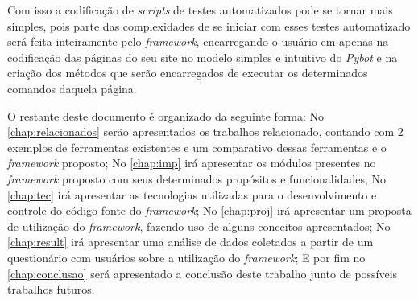     Com isso a codificação de \textit{scripts} de testes automatizados pode se tornar mais simples, pois parte das complexidades de se iniciar com esses testes automatizado será
    feita inteiramente pelo \textit{framework}, encarregando o usuário em apenas na  codificação das páginas do seu site no modelo simples e intuitivo do \textit{Pybot} e na criação dos métodos que
    serão encarregados de executar os determinados comandos daquela página.

    O restante deste documento é organizado da seguinte forma:
    No \autoref{chap:relacionados} serão apresentados os trabalhos relacionado, contando com 2 exemplos de ferramentas existentes e um comparativo dessas ferramentas e o \textit{framework} proposto;
    No \autoref{chap:imp} irá apresentar os módulos presentes no \textit{framework} proposto com seus determinados propósitos e funcionalidades;
    No \autoref{chap:tec} irá apresentar as tecnologias utilizadas para o desenvolvimento e controle do código fonte do \textit{framework};
    No \autoref{chap:proj} irá apresentar um proposta de utilização do \textit{framework}, fazendo uso de alguns conceitos apresentados;
    No \autoref{chap:result} irá apresentar uma análise de dados coletados a partir de um questionário com usuários sobre a utilização do \textit{framework};
    E por fim no \autoref{chap:conclusao} será apresentado a conclusão deste trabalho junto de possíveis trabalhos futuros.